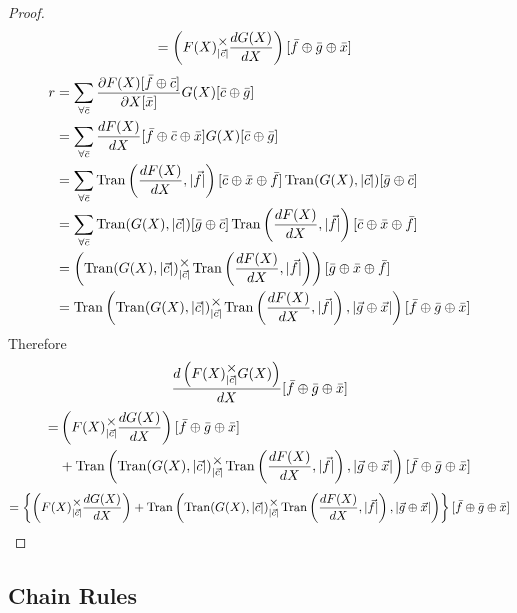 \documentclass[12pt]{article}
\theoremstyle{definition}
\theoremstyle{case}
\theoremstyle{ppart}
\DeclareMathOperator{\Tran}{Tran}
\newcommand{\mmult}[1]{\text{\raisebox{1ex}{$\underset{#1}{\times}$}}}
\begin{document}
\begin{landscape}
\begin{proof}
\begin{align*}
 &=
	 \left( F(X) \mmult{|\vec{c}|} \frac{dG(X)}{dX} \right)
	 [\bar{f} \oplus \bar{g} \oplus \bar{x}]
\end{align*}
\begin{align*}
 r
 &=
	\sum_{\forall \bar{c}}
		\frac{\partial F(X)[\bar{f} \oplus \bar{c}]}{\partial X[\bar{x}]}
		G(X)[\bar{c} \oplus \bar{g}] \\
 &=
	\sum_{\forall \bar{c}}
		\frac{dF(X)}{dX}[\bar{f} \oplus \bar{c} \oplus \bar{x}]
		G(X)[\bar{c} \oplus \bar{g}] \\
 &=
	\sum_{\forall \bar{c}}
		\Tran\left(\frac{dF(X)}{dX}, |\vec{f}|\right)
			[\bar{c} \oplus \bar{x} \oplus \bar{f}]
		\Tran(G(X), |\vec{c}|)[\bar{g} \oplus \bar{c}] \\
 &=
	\sum_{\forall \bar{c}}
		\Tran(G(X), |\vec{c}|)[\bar{g} \oplus \bar{c}]
		\Tran\left(\frac{dF(X)}{dX}, |\vec{f}|\right)
			[\bar{c} \oplus \bar{x} \oplus \bar{f}] \\
 &=
  \left(
		\Tran(G(X), |\vec{c}|) \mmult{|\vec{c}|}
		\Tran\left(\frac{dF(X)}{dX}, |\vec{f}|\right)
	\right)[\bar{g} \oplus \bar{x} \oplus \bar{f}] \\
 &= 
  \Tran\left(
		\Tran(G(X), |\vec{c}|) \mmult{|\vec{c}|}
		\Tran\left(\frac{dF(X)}{dX}, |\vec{f}|\right)
		, |\vec{g} \oplus \vec{x}|
	\right)[\bar{f} \oplus \bar{g} \oplus \bar{x}]
\end{align*}
Therefore 
\[
 \frac{d\left(F(X) \mmult{|\vec{c}|} G(X)\right)}{dX}
  [\bar{f} \oplus \bar{g} \oplus \bar{x}]
\]
\begin{align*}
	=& 
	\left( F(X) \mmult{|\vec{c}|} \frac{dG(X)}{dX} \right)
	[\bar{f} \oplus \bar{g} \oplus \bar{x}] \\
	&+
  \Tran\left(
		\Tran(G(X), |\vec{c}|) \mmult{|\vec{c}|}
		\Tran\left(\frac{dF(X)}{dX}, |\vec{f}|\right)
		, |\vec{g} \oplus \vec{x}|
	\right)[\bar{f} \oplus \bar{g} \oplus \bar{x}] \\
\end{align*}
\[
	=
  \left\{
		\left( F(X) \mmult{|\vec{c}|} \frac{dG(X)}{dX} \right)
		+
		\Tran\left(
			\Tran(G(X), |\vec{c}|) \mmult{|\vec{c}|}
			\Tran\left(\frac{dF(X)}{dX}, |\vec{f}|\right)
			, |\vec{g} \oplus \vec{x}|
		\right)
	\right\}
	[\bar{f} \oplus \bar{g} \oplus \bar{x}]
\]
\end{proof}
\end{landscape}

\subsection{Chain Rules}
\end{document}
